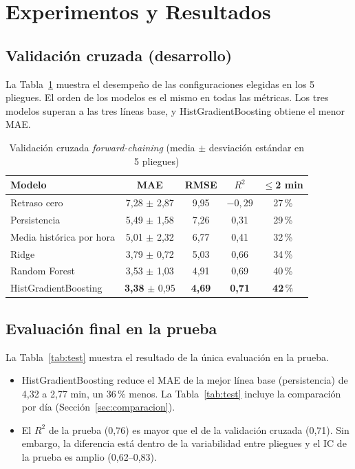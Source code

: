 \documentclass[conference,spanish]{IEEEtran}
\begin{document}
\section{Experimentos y Resultados}

\subsection{Validación cruzada (desarrollo)}
La Tabla~\ref{tab:cv} muestra el desempeño de las configuraciones elegidas en los 5 pliegues. El orden de los modelos es el mismo en todas las métricas. Los tres modelos superan a las tres líneas base, y HistGradientBoosting obtiene el menor MAE.

\begin{table}[h]
\centering
\caption{Validación cruzada \textit{forward-chaining} (media $\pm$ desviación estándar en 5 pliegues)}
\label{tab:cv}
\footnotesize
\begin{tabular}{@{}lcccc@{}}
\toprule
\textbf{Modelo} & \textbf{MAE} & \textbf{RMSE} & \textbf{$R^2$} & \textbf{$\le$2 min}\\
\midrule
Retraso cero & 7,28 $\pm$ 2,87 & 9,95 & $-0{,}29$ & 27\,\%\\
Persistencia & 5,49 $\pm$ 1,58 & 7,26 & 0,31 & 29\,\%\\
Media histórica por hora & 5,01 $\pm$ 2,32 & 6,77 & 0,41 & 32\,\%\\
Ridge & 3,79 $\pm$ 0,72 & 5,03 & 0,66 & 34\,\%\\
Random Forest & 3,53 $\pm$ 1,03 & 4,91 & 0,69 & 40\,\%\\
HistGradientBoosting & \textbf{3,38} $\pm$ 0,95 & \textbf{4,69} & \textbf{0,71} & \textbf{42}\,\%\\
\bottomrule
\end{tabular}
\end{table}

\subsection{Evaluación final en la prueba}
La Tabla~\ref{tab:test} muestra el resultado de la única evaluación en la prueba.
\begin{itemize}
    \item HistGradientBoosting reduce el MAE de la mejor línea base (persistencia) de 4,32 a 2,77 min, un 36\,\% menos. La Tabla~\ref{tab:test} incluye la comparación por día (Sección~\ref{sec:comparacion}).
    \item El $R^2$ de la prueba (0,76) es mayor que el de la validación cruzada (0,71). Sin embargo, la diferencia está dentro de la variabilidad entre pliegues y el IC de la prueba es amplio (0,62--0,83).
\end{itemize}
\end{document}
